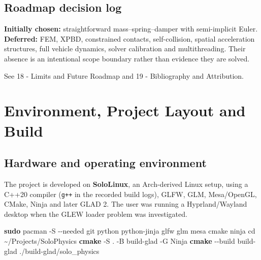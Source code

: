 \documentclass[
  10pt,
  a4paper,
]{article}
\newenvironment{Shaded}{\begin{snugshade}}{\end{snugshade}}
\newcommand{\AttributeTok}[1]{\textcolor[rgb]{0.13,0.29,0.53}{#1}}
\newcommand{\BuiltInTok}[1]{#1}
\newcommand{\ExtensionTok}[1]{#1}
\newcommand{\FunctionTok}[1]{\textcolor[rgb]{0.13,0.29,0.53}{\textbf{#1}}}
\newcommand{\NormalTok}[1]{#1}
\begin{document}
\subsection{Roadmap decision log}\label{roadmap-decision-log}

\textbf{Initially chosen:} straightforward mass--spring--damper with
semi-implicit Euler. \textbf{Deferred:} FEM, XPBD, constrained contacts,
self-collision, spatial acceleration structures, full vehicle dynamics,
solver calibration and multithreading. Their absence is an intentional
scope boundary rather than evidence they are solved.

See 18 - Limits and Future Roadmap and 19 - Bibliography and
Attribution.

\newpage

\section{Environment, Project Layout and
Build}\label{environment-project-layout-and-build}

\subsection{Hardware and operating
environment}\label{hardware-and-operating-environment}

The project is developed on \textbf{SoloLinux}, an Arch-derived Linux
setup, using a C++20 compiler (\texttt{g++} in the recorded build logs),
GLFW, GLM, Mesa/OpenGL, CMake, Ninja and later GLAD 2. The user was
running a Hyprland/Wayland desktop when the GLEW loader problem was
investigated.

\begin{Shaded}
\begin{Highlighting}[]
\FunctionTok{sudo}\NormalTok{ pacman }\AttributeTok{{-}S} \AttributeTok{{-}{-}needed}\NormalTok{ git python python{-}jinja glfw glm mesa cmake ninja}
\BuiltInTok{cd}\NormalTok{ \textasciitilde{}/Projects/SoloPhysics}
\FunctionTok{cmake} \AttributeTok{{-}S}\NormalTok{ . }\AttributeTok{{-}B}\NormalTok{ build{-}glad }\AttributeTok{{-}G}\NormalTok{ Ninja}
\FunctionTok{cmake} \AttributeTok{{-}{-}build}\NormalTok{ build{-}glad}
\ExtensionTok{./build{-}glad/solo\_physics}
\end{Highlighting}
\end{Shaded}
\end{document}
